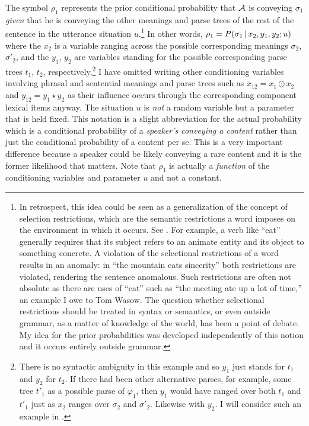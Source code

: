 The symbol $\rho_1$ represents the prior conditional probability that $\cal A$ is conveying $\sigma_1$ \emph{given} that he is conveying the other meanings and parse trees of the rest of the sentence in the utterance situation $u$.\footnote{In retrospect, this idea could be seen as a generalization of the concept of selection restrictions, which are the semantic restrictions a word imposes on the environment in which it occurs. See \citet{chomsky:ats}. For example, a verb like ``eat'' generally requires that its subject refers to an animate entity and its object to something concrete. A violation of the selectional restrictions of a word results in an anomaly: in ``the mountain eats sincerity'' both restrictions are violated, rendering the sentence anomalous. Such restrictions are often not absolute as there are uses of ``eat'' such as ``the meeting ate up a lot of time,'' an example I owe to Tom Wasow. The question whether selectional restrictions should be treated in syntax or semantics, or even outside grammar, as a matter of knowledge of the world, has been a point of debate. My idea for the prior probabilities was developed independently of this notion and it occurs entirely outside grammar.} In other words, $\rho_1 = P(\sigma_1 \,|\, x_2, y_1, y_2; u)$ where the $x_2$ is a variable ranging across the possible corresponding meanings $\sigma_2$, $\sigma'_2$, and the $y_1$, $y_2$ are variables standing for the possible corresponding parse trees $t_1$, $t_2$, respectively.\footnote{There is no syntactic ambiguity in this example and so $y_1$ just stands for $t_1$ and $y_2$ for $t_2$. If there had been other alternative parses, for example, some tree $t'_1$ as a possible parse of $\varphi_1$, then $y_1$ would have ranged over both $t_1$ and $t'_1$ just as $x_2$ ranges over $\sigma_2$ and $\sigma'_2$. Likewise with $y_2$. I will consider such an example in .} I have omitted writing other conditioning variables involving phrasal and sentential meanings and parse trees such as $x_{12} = x_1 \odot x_2$ and $y_{12} = y_1 \star y_2$ as their influence occurs through the corresponding component lexical items anyway. The situation $u$ is \emph{not} a random variable but a parameter that is held fixed. This notation is a slight abbreviation for the actual probability which is a conditional probability of a \emph{speaker's conveying a content} \label{page:intention} rather than just the conditional probability of a content per se. This is a very important difference because a speaker could be likely conveying a rare content and it is the former likelihood that matters. Note that $\rho_1$ is actually a \emph{function} of the conditioning variables and parameter $u$ and not a constant. 

